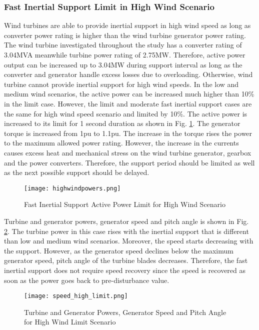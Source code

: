 \subsubsection{Fast Inertial Support Limit in High Wind Scenario}
Wind turbines are able to provide inertial support in high wind speed as long as converter power rating is higher than the wind turbine generator power rating. The wind turbine investigated throughout the study has a converter rating of 3.04MVA meanwhile turbine power rating of 2.75MW. Therefore, active power output can be increased up to 3.04MW during support interval as long as the converter and generator handle excess losses due to overloading. Otherwise, wind turbine cannot provide inertial support for high wind speeds. In the low and medium wind scenarios, the active power can be increased much higher than 10\% in the limit case. However, the limit and moderate fast inertial support cases are the same for high wind speed scenario and limited by 10\%. The active power is increased to its limit for 1 second duration as shown in Fig. \ref{high_powers}. The generator torque is increased from 1pu to 1.1pu. The increase in the torque rises the power to the maximum allowed power rating. However, the increase in the currents causes excess heat and mechanical stress on the wind turbine generator, gearbox and the power converters. Therefore, the support period should be limited as well as the next possible support should be delayed. \par
\begin{figure}[h]
	\centering
	\texttt{[image: highwindpowers.png]}
	\caption{Fast Inertial Support Active Power Limit for High Wind Scenario}
	\label{high_powers}
\end{figure}
Turbine and generator powers, generator speed and pitch angle is shown in Fig. \ref{high_limit_speed}. The turbine power in this case rises with the inertial support that is different than low and medium wind scenarios. Moreover, the speed starts decreasing with the support. However, as the generator speed declines below the maximum generator speed, pitch angle of the turbine blades decreases. Therefore, the fast inertial support does not require speed recovery since the speed is recovered as soon as the power goes back to pre-disturbance value. \par
\begin{figure}[h]
	\centering
	\texttt{[image: speed\_high\_limit.png]}
	\caption{Turbine and Generator Powers, Generator Speed and Pitch Angle for High Wind Limit Scenario}
	\label{high_limit_speed}
\end{figure}
